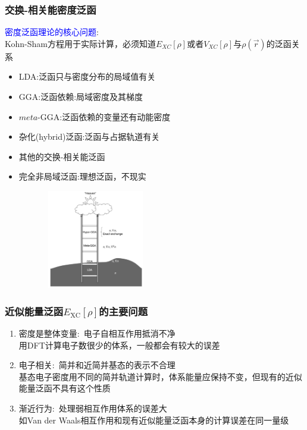 \documentclass[cjk,slidestop,compress,mathserif,blue]{beamer}
\begin{document}
\frame                               %
{
\frametitle{交换-相关能密度泛函}
\textcolor{blue}{密度泛函理论的核心问题}:\\
\textrm{Kohn-Sham}方程用于实际计算，必须知道$E_{XC}[\rho]$或者$V_{XC}[\rho]$与$\rho(\vec r)$的泛函关系
\vskip 15pt
\begin{minipage}[b]{0.59\textwidth}
 \hspace*{-15pt}
 {\fontsize{7.5pt}{6.0pt}\selectfont\begin{itemize}%
	 \setlength{\itemsep}{10pt}
 \item \textrm{LDA}:泛函只与密度分布的局域值有关
 \item \textrm{GGA}:泛函依赖:局域密度及其梯度
 \item $meta$-\textrm{GGA}:泛函依赖的变量还有动能密度
 \item 杂化(\textrm{hybrid})泛函:泛函与占据轨道有关
 \item 其他的交换-相关能泛函
 \item<1-> 完全非局域泛函:理想泛函，不现实
 \end{itemize}}
\end{minipage}
\hfill
\begin{minipage}[b]{0.39\textwidth}
\hspace*{-10pt}
\includegraphics[height=1.7in,width=3.18in,viewport=10 5 1380 700,clip]{Figures/Jacobi-ladder.png}\\
\end{minipage}
}

\frame                               %
{
	\frametitle{近似能量泛函$E_{\mathrm{XC}}[\rho]$的主要问题}
\vskip 20pt
\begin{enumerate}%
   \setlength{\itemsep}{10pt}
 \item  密度是整体变量:~电子自相互作用抵消不净\\%
	 用\textrm{DFT}计算电子数很少的体系，一般都会有较大的误差
 \item  电子相关:~简并和近简并基态的表示不合理\\
	 基态电子密度用不同的简并轨道计算时，体系能量应保持不变，但现有的近似能量泛函不具有这个性质
 \item  渐近行为:~处理弱相互作用体系的误差大\\
	 如\textrm{Van der Waals}相互作用和现有近似能量泛函本身的计算误差在同一量级
 \end{enumerate}
}
\end{document}
